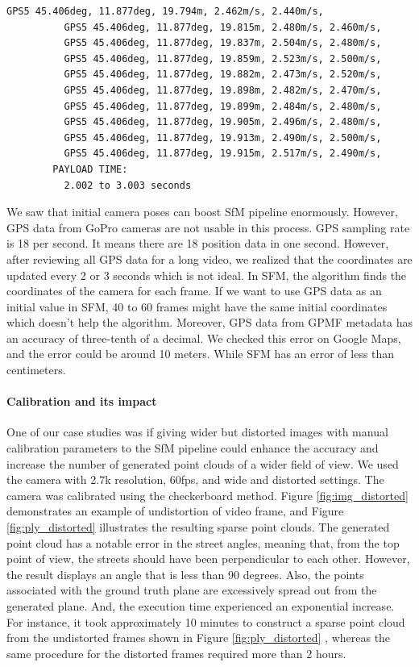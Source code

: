\documentclass[11pt]{article}
\begin{document}
\begin{lstlisting}[language=bash,caption={gpmf-parser output},label={lst:lstlisting}]
          GPS5 45.406deg, 11.877deg, 19.794m, 2.462m/s, 2.440m/s,
          GPS5 45.406deg, 11.877deg, 19.815m, 2.480m/s, 2.460m/s,
          GPS5 45.406deg, 11.877deg, 19.837m, 2.504m/s, 2.480m/s,
          GPS5 45.406deg, 11.877deg, 19.859m, 2.523m/s, 2.500m/s,
          GPS5 45.406deg, 11.877deg, 19.882m, 2.473m/s, 2.520m/s,
          GPS5 45.406deg, 11.877deg, 19.898m, 2.482m/s, 2.470m/s,
          GPS5 45.406deg, 11.877deg, 19.899m, 2.484m/s, 2.480m/s,
          GPS5 45.406deg, 11.877deg, 19.905m, 2.496m/s, 2.480m/s,
          GPS5 45.406deg, 11.877deg, 19.913m, 2.490m/s, 2.500m/s,
          GPS5 45.406deg, 11.877deg, 19.915m, 2.517m/s, 2.490m/s,
        PAYLOAD TIME:
          2.002 to 3.003 seconds
    \end{lstlisting}

    We saw that initial camera poses can boost SfM pipeline enormously. However, GPS data from GoPro cameras
    are not usable in this process.
    GPS sampling rate is 18 per second. It means there are 18 position data in one second. However, after reviewing
    all GPS data for a long video, we realized that the coordinates are updated every 2 or 3 seconds which is not ideal.
    In SFM, the algorithm finds the coordinates of the camera for each frame. If we want to use GPS data as an initial
    value in SFM, 40 to 60 frames might have the same initial coordinates which doesn't help the algorithm.
    Moreover, GPS data from GPMF metadata has an accuracy of three-tenth of a decimal. We checked this error on
    Google Maps, and the error could be around 10 meters. While SFM has an error of less than centimeters.

    \paragraph{Calibration and its impact}
    One of our case studies was if giving wider but distorted images with manual calibration parameters to the SfM pipeline
    could enhance the accuracy and increase the number of generated point clouds of a wider field of view. We used
    the camera with 2.7k resolution, 60fps, and wide and distorted settings. The camera was calibrated using the
    checkerboard method. Figure \ref{fig:img_distorted} demonstrates an example of undistortion of video frame,
    and Figure \ref{fig:ply_distorted} illustrates the resulting sparse point clouds.
    The generated point cloud has a notable error in the street angles, meaning that, from the top point of view, the
    streets should have been perpendicular to each other. However, the result displays an angle that is less than 90 degrees.
    Also, the points associated with the ground truth plane are excessively spread out from the generated plane.
    And, the execution time experienced an exponential increase. For instance, it took approximately
    10 minutes to construct a sparse point cloud from the undistorted frames shown in Figure \ref{fig:ply_distorted}
    , whereas the same procedure for the distorted frames required more than 2 hours.
\end{document}
